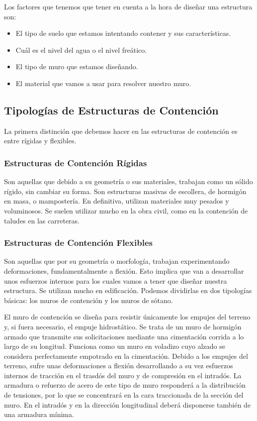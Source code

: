 Los factores que tenemos que tener en cuenta a la hora de diseñar una estructura son:

\begin{itemize}
    \item El tipo de suelo que estamos intentando contener y sus características.
    \item Cuál es el nivel del agua o el nivel freático.
    \item El tipo de muro que estamos diseñando.
    \item El material que vamos a usar para resolver nuestro muro.
\end{itemize}

\subsection*{Tipologías de Estructuras de Contención}

La primera distinción que debemos hacer en las estructuras de contención es entre rígidas y flexibles.

\subsubsection*{Estructuras de Contención Rígidas}

Son aquellas que debido a su geometría o sus materiales, trabajan como un sólido rígido, sin cambiar su forma. Son estructuras masivas de escollera, de hormigón en masa, o mampostería. En definitiva, utilizan materiales muy pesados y voluminosos. Se suelen utilizar mucho en la obra civil, como en la contención de taludes en las carreteras.

\subsubsection*{Estructuras de Contención Flexibles}

Son aquellas que por su geometría o morfología, trabajan experimentando deformaciones, fundamentalmente a flexión. Esto implica que van a desarrollar unos esfuerzos internos para los cuales vamos a tener que diseñar nuestra estructura. Se utilizan mucho en edificación. Podemos dividirlas en dos tipologías básicas: los muros de contención y los muros de sótano.


El muro de contención se diseña para resistir únicamente los empujes del terreno y, si fuera necesario, el empuje hidrostático. Se trata de un muro de hormigón armado que transmite sus solicitaciones mediante una cimentación corrida a lo largo de su longitud. Funciona como un muro en voladizo cuyo alzado se considera perfectamente empotrado en la cimentación. Debido a los empujes del terreno, sufre unas deformaciones a flexión desarrollando a su vez esfuerzos internos de tracción en el trasdós del muro y de compresión en el intradós. La armadura o refuerzo de acero de este tipo de muro responderá a la distribución de tensiones, por lo que se concentrará en la cara traccionada de la sección del muro. En el intradós y en la dirección longitudinal deberá disponerse también de una armadura mínima.

